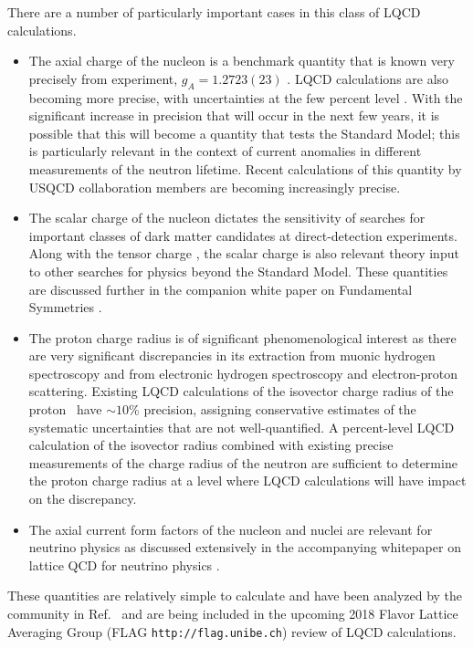 There are a number of particularly important cases in this class of LQCD calculations. 
\begin{itemize}
	\item The axial charge of the nucleon is a benchmark quantity that is known very precisely from experiment, $g_A=1.2723(23)$ \cite{Patrignani:2016xqp}. LQCD calculations are also becoming more precise, with uncertainties at the few percent level  \cite{Bhattacharya:2016zcn,Yoon:2016jzj,Chang:2018uxx,Gupta:2018qil}. With the significant increase in precision that will occur in the next few years, it is possible that this will  become a quantity that tests the Standard Model; this is particularly relevant in the context of current anomalies in different measurements of the neutron lifetime. Recent calculations of this quantity by USQCD collaboration members are becoming increasingly precise.
	
	\item The scalar charge of the nucleon dictates the sensitivity of searches for important classes of dark matter candidates at direct-detection experiments. Along with the tensor charge \cite{Gupta:2018lvp}, the scalar charge \cite{Shanahan:2016pla}  is also relevant theory input to other searches for physics beyond the Standard Model. These quantities are discussed further in the companion white paper on Fundamental Symmetries \cite{Davoudi:2018qcd}.
	
	\item The proton charge radius is  of significant phenomenological interest as there are very significant discrepancies in its extraction from muonic hydrogen spectroscopy  and from electronic hydrogen spectroscopy and electron-proton scattering. Existing LQCD calculations of the isovector charge radius of the
proton~\cite{Capitani:2015sba,Hasan:2017wwt,Alexandrou:2017ypw,Ishikawa:2018rew,Detmold:2018ptb,Alexandrou:2018sjm}  have $\sim10$\% precision, assigning conservative estimates of the systematic uncertainties that are not well-quantified. A  percent-level  LQCD calculation of the isovector radius combined with existing precise measurements of the charge radius of the neutron are sufficient to determine the proton charge radius at a level where LQCD calculations will  have impact on the discrepancy. 
	
	\item The axial current form factors of the nucleon and nuclei are relevant for neutrino physics as discussed extensively in the  accompanying whitepaper on lattice QCD for neutrino physics \cite{Kronfeld:2018qcd}.
\end{itemize} 
These quantities are relatively simple to calculate  and have been analyzed by the community in Ref.~\cite{Lin:2017snn} and  are being included in the upcoming 2018 Flavor Lattice Averaging Group (FLAG {\tt http://flag.unibe.ch})
review of LQCD calculations.


